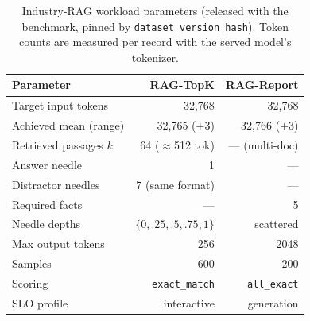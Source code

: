 \begin{table}[t]
  \centering
  \small
  \begin{tabular}{@{}l r r@{}}
    \toprule
    \textbf{Parameter} & \textbf{RAG-TopK} & \textbf{RAG-Report} \\
    \midrule
    Target input tokens        & 32{,}768 & 32{,}768 \\
    Achieved mean (range)      & 32{,}765 ($\pm$3) & 32{,}766 ($\pm$3) \\
    Retrieved passages $k$     & 64 ($\approx$512 tok) & --- (multi-doc) \\
    Answer needle              & 1 & --- \\
    Distractor needles         & 7 (same format) & --- \\
    Required facts             & --- & 5 \\
    Needle depths              & $\{0,.25,.5,.75,1\}$ & scattered \\
    Max output tokens          & 256 & 2048 \\
    Samples                    & 600 & 200 \\
    Scoring                    & \texttt{exact\_match} & \texttt{all\_exact} \\
    SLO profile                & interactive & generation \\
    \bottomrule
  \end{tabular}
  \caption{Industry-RAG workload parameters (released with the benchmark, pinned by
  \texttt{dataset\_version\_hash}). Token counts are measured per record with the
  served model's tokenizer.}
  \label{tab:rag-params}
\end{table}

